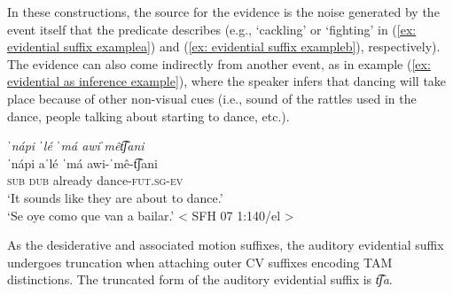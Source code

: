 \ea\label{ex: evidential suffix example}

    \label{ex: evidential suffix examplea}
        \label{ex: evidential suffix exampleb}
    \z
\z

In these constructions, the source for the evidence is the noise generated by the event itself that the predicate describes (e.g., ‘cackling’ or ‘fighting’ in (\ref{ex: evidential suffix examplea}) and (\ref{ex: evidential suffix exampleb}), respectively). The evidence can also come indirectly from another event, as in example
    (\ref{ex: evidential as inference example}), where the speaker infers that dancing will take place because of other non-visual cues (i.e., sound of the rattles used in the dance, people talking about starting to dance, etc.).

\ea\label{ex: evidential as inference example}

    \textit{ˈnápi ˈlé ˈmá awiˈmêt͡ʃani}\\
    \gll    ˈnápi aˈlé ˈmá awi-ˈmê-t͡ʃani\\
            \textsc{sub} \textsc{dub} already dance-\textsc{fut.sg-ev}\\
    \glt    ‘It sounds like they are about to dance.’\\
    \glt ‘Se oye como que van a bailar.’ < SFH 07 1:140/el >\\

\z

As the desiderative and associated motion suffixes, the auditory evidential suffix undergoes truncation when attaching outer CV suffixes encoding TAM distinctions. The truncated form of the auditory evidential suffix is \textit{t͡ʃa}.

